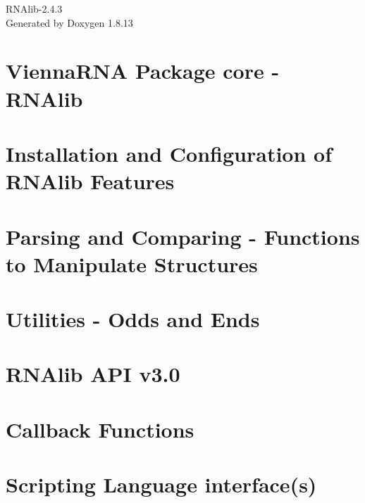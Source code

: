 \documentclass[twoside]{book}
\newcommand{\+}{\discretionary{\mbox{\scriptsize$\hookleftarrow$}}{}{}}
\newcommand{\clearemptydoublepage}{%
  \newpage{\pagestyle{empty}\cleardoublepage}%
}
\begin{document}
\hypersetup{pageanchor=false,
             bookmarksnumbered=true,
             pdfencoding=unicode
            }
\begin{titlepage}
\vspace*{7cm}
\begin{center}%
{\Large R\+N\+Alib-\/2.4.3 }\\
\vspace*{1cm}
{\large Generated by Doxygen 1.8.13}\\
\end{center}
\end{titlepage}
\clearemptydoublepage
{}
\tableofcontents
\clearemptydoublepage
{}
\hypersetup{pageanchor=true}

\chapter{Vienna\+R\+NA Package core -\/ R\+N\+Alib}
\label{index}\hypertarget{index}{}
\chapter{Installation and Configuration of R\+N\+Alib Features}
\label{install}

\chapter{Parsing and Comparing -\/ Functions to Manipulate Structures}
\label{mp_parse}

\chapter{Utilities -\/ Odds and Ends}
\label{mp_utils}

\chapter{R\+N\+Alib A\+PI v3.0}
\label{newAPI}

\chapter{Callback Functions}
\label{callbacks}

\chapter{Scripting Language interface(s)}
\label{scripting}

\end{document}

